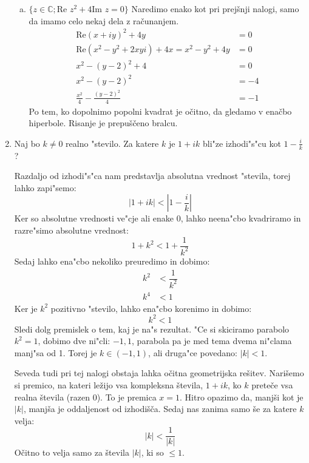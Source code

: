 \documentclass[12pt,a4paper,slovene]{article}
\begin{document}
\begin{enumerate}[(1)]
\begin{enumerate}[(a)]
        \item $\{ z \in \mathbb{C}; \text{Re }z^2 + 4 \text{Im }z = 0 \}$
        Naredimo enako kot pri prejšnji nalogi, samo da imamo celo nekaj dela z računanjem.
        \begin{align*}
            \text{Re}(x + iy)^2 + 4y &= 0\\
            \text{Re}(x^2 - y^2 + 2xyi) + 4x = x^2 - y^2 + 4y &= 0\\
            x^2 - (y - 2)^2 + 4 &= 0\\
            x^2 - (y - 2)^2 &= -4\\
            \frac{x^2}{4} - \frac{(y-2)^2}{4} &= -1
        \end{align*}
        Po tem, ko dopolnimo popolni kvadrat je očitno, da gledamo v enačbo hiperbole. Risanje je prepuščeno bralcu.
    \end{enumerate}
	
	\item Naj bo $k \neq 0$ realno "stevilo. Za katere $k$ je $1 + ik$ bli"ze izhodi"s"cu kot $1-\frac{i}{k}$?
	
	Razdaljo od izhodi"s"ca nam predstavlja absolutna vrednost "stevila, torej lahko zapi"semo:
	\begin{equation*}
	|1+ik| < \left|1-\dfrac{i}{k}\right|
	\end{equation*}
	Ker so absolutne vrednosti ve"cje ali enake 0, lahko neena"cbo kvadriramo in razre"simo absolutne vrednost:
	\begin{equation*}
	1 + k^2 < 1 + \dfrac{1}{k^2}
	\end{equation*}
	Sedaj lahko ena"cbo nekoliko preuredimo in dobimo:
	\begin{align*}
	k^2 &< \dfrac{1}{k^2}\\
	k^4 &< 1
	\end{align*}
	Ker je $k^2$ pozitivno "stevilo, lahko ena"cbo korenimo in dobimo:
	\begin{equation*}
	k^2 < 1
	\end{equation*}
	Sledi dolg premislek o tem, kaj je na"s rezultat. "Ce si skiciramo parabolo $k^2 = 1$, dobimo dve ni"cli: $-1, 1$, parabola pa je med tema dvema ni"clama manj"sa od 1. Torej je $k \in (-1, 1)$, ali druga"ce povedano: $|k| < 1$.
    
    Seveda tudi pri tej nalogi obstaja lahka očitna geometrijska rešitev. Narišemo si premico, na kateri ležijo vsa kompleksna števila, $1 + ik$, ko $k$ preteče vsa realna števila (razen 0). To je premica $x = 1$. Hitro opazimo da, manjši kot je $|k|$, manjša je oddaljenost od izhodišča. Sedaj nas zanima samo še za katere $k$ velja:
    \[
    |k| < \frac{1}{|k|}
    \]
    Očitno to velja samo za števila $|k|$, ki so $\leq 1$.


\end{enumerate}
\end{document}
